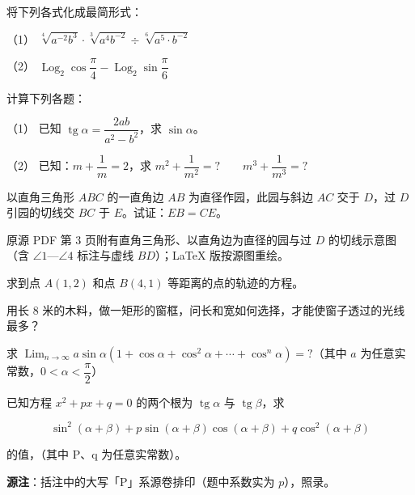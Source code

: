 \begin{question}
将下列各式化成最简形式：

（1） $\sqrt[4]{a^{-2}b^{3}}\cdot\sqrt[3]{a^{4}b^{-2}}\div\sqrt[6]{a^{5}\cdot b^{-2}}$

（2） $\operatorname{Log}_2\cos\dfrac{\pi}{4}-\operatorname{Log}_2\sin\dfrac{\pi}{6}$

\end{question}
\begin{question}
计算下列各题：

（1） 已知 $\operatorname{tg}\alpha=\dfrac{2ab}{a^{2}-b^{2}}$，求 $\sin\alpha$。

（2） 已知：$m+\dfrac{1}{m}=2$，求 $m^{2}+\dfrac{1}{m^{2}}=?\qquad m^{3}+\dfrac{1}{m^{3}}=?$

\Needspace{0.4\textheight}
\end{question}
\begin{question}
以直角三角形 $ABC$ 的一直角边 $AB$ 为直径作园，此园与斜边 $AC$ 交于 $D$，过 $D$ 引园的切线交 $BC$ 于 $E$。试证：$EB=CE$。

\begin{gktip}
原源 PDF 第 3 页附有直角三角形、以直角边为直径的园与过 $D$ 的切线示意图（含 $\angle1$—$\angle4$ 标注与虚线 $BD$）；LaTeX 版按源图重绘。
\end{gktip}
\nopagebreak[4]
\begin{center}\end{center}
\nopagebreak[4]
\end{question}
\begin{question}
求到点 $A(1,2)$ 和点 $B(4,1)$ 等距离的点的轨迹的方程。

\end{question}
\begin{question}
用长 $8$ 米的木料，做一矩形的窗框，问长和宽如何选择，才能使窗子透过的光线最多？

\end{question}
\begin{question}
求 $\operatorname{Lim}_{n\to\infty}a\sin\alpha\left(1+\cos\alpha+\cos^{2}\alpha+\cdots+\cos^{n}\alpha\right)=?$（其中 $a$ 为任意实常数，$0<\alpha<\dfrac{\pi}{2}$）

\end{question}
\begin{question}
已知方程 $x^{2}+px+q=0$ 的两个根为 $\operatorname{tg}\alpha$ 与 $\operatorname{tg}\beta$，求

\nopagebreak[4]
\[
\sin^{2}(\alpha+\beta)+p\sin(\alpha+\beta)\cos(\alpha+\beta)+q\cos^{2}(\alpha+\beta)
\]

的值，（其中 P、q 为任意实常数）。

\begin{gktip}
\textbf{源注}：括注中的大写「P」系源卷排印（题中系数实为 $p$），照录。
\end{gktip}

\Needspace{0.4\textheight}
\end{question}
